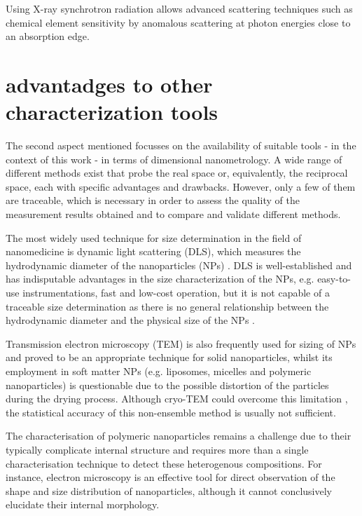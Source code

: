 Using X-ray synchrotron radiation allows advanced scattering techniques such as chemical element sensitivity by anomalous scattering at photon energies close to an absorption edge.


\section{advantadges to other characterization tools}

The second aspect mentioned focusses on the availability of suitable tools - in the context of this work - in terms of dimensional nanometrology. A wide range of different methods exist that probe the real space or, equivalently, the reciprocal space, each with specific advantages and drawbacks. However, only a few of them are traceable, which is necessary in order to assess the quality of the measurement results obtained and to compare and validate different methods. 

The most widely used technique for size determination in the field of nanomedicine is dynamic light scattering (DLS), which measures the hydrodynamic diameter of the nanoparticles (NPs) \citep{murphy_static_1997, hallett_vesicle_1991, egelhaaf_determination_1996, takahashi_precise_2008, jans_dynamic_2009, hoo_comparison_2008}. DLS is well-established and has indisputable advantages in the size characterization of the NPs, e.g. easy-to-use instrumentations, fast and low-cost operation, but it is not capable of a traceable size determination as there is no general relationship between the hydrodynamic diameter and the physical size of the NPs \citep{meli_traceable_2012}. 

Transmission electron microscopy (TEM) is also frequently used for sizing of NPs and proved to be an appropriate technique for solid nanoparticles, whilst its employment in soft matter NPs (e.g. liposomes, micelles and polymeric nanoparticles) is questionable due to the possible distortion of the particles during the drying process.  Although cryo-TEM could overcome this limitation \citep{li_doxorubicin_1998}, the statistical accuracy of this non-ensemble method is usually not sufficient.

The characterisation of polymeric nanoparticles remains a challenge due to their typically complicate internal structure\citep{beyer_saxs_1990} and requires more than a single characterisation technique to detect these heterogenous compositions. For instance, electron microscopy is an effective tool for direct observation of the shape and size distribution of nanoparticles, although it cannot conclusively elucidate their internal morphology.

